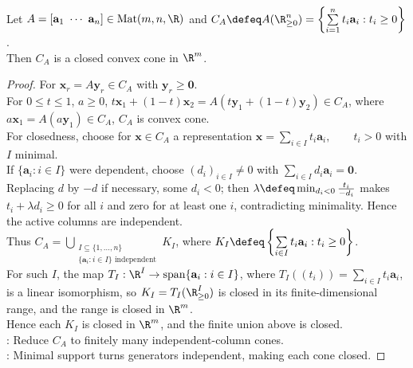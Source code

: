 \begin{lemma} \label{lem:finitely-generated-nonnegative-cone-closed-convex} \\
Let $A=[\mathbf{a}_1\ \cdots\ \mathbf{a}_n]\in\operatorname{Mat}(m,n,\R)$ and $C_A\defeq A(\R_{\geq0}^n)=\left\{\sum\limits_{i=1}^n t_i\mathbf{a}_i:t_i\geq0\right\}$.\\
Then $C_A$ is a closed convex cone in $\R^m$.
\begin{proof}
For $\mathbf{x}_r=A\mathbf{y}_r\in C_A$ with $\mathbf{y}_r\geq\mathbf{0}$.\\
For $0\leq t\leq1$, $a\geq0$, $t\mathbf{x}_1+(1-t)\mathbf{x}_2=A(t\mathbf{y}_1+(1-t)\mathbf{y}_2)\in C_A$, where $a\mathbf{x}_1=A(a\mathbf{y}_1)\in C_A$, $C_A$ is convex cone.\\
For closedness, choose for $\mathbf{x}\in C_A$ a representation $\mathbf{x}=\sum\limits_{i\in I}t_i\mathbf{a}_i,\qquad t_i>0$ with $I$ minimal.\\
If $\{\mathbf{a}_i:i\in I\}$ were dependent, choose $(d_i)_{i\in I}\neq0$ with $\sum\limits_{i\in I}d_i\mathbf{a}_i=\mathbf{0}$.\\
Replacing $d$ by $-d$ if necessary, some $d_i<0$; then $\lambda\defeq\min_{d_i<0}\frac{t_i}{-d_i}$ makes $t_i+\lambda d_i\geq0$ for all $i$ and zero for at least one $i$, contradicting minimality. Hence the active columns are independent.\\
Thus $C_A=\bigcup\limits_{\substack{I\subseteq\{1,\ldots,n\}\\ \{\mathbf{a}_i:i\in I\}\text{ independent}}} K_I$, where $K_I\defeq\left\{\sum\limits_{i\in I}t_i\mathbf{a}_i:t_i\geq0\right\}$.\\
For such $I$, the map $T_I:\R^I\to\operatorname{span}\{\mathbf{a}_i:i\in I\}$, where $T_I((t_i))=\sum\limits_{i\in I}t_i\mathbf{a}_i$, is a linear isomorphism, so $K_I=T_I(\R_{\geq0}^I)$ is closed in its finite-dimensional range, and the range is closed in $\R^m$.\\
Hence each $K_I$ is closed in $\R^m$, and the finite union above is closed.\\
: Reduce $C_A$ to finitely many independent-column cones.\\
: Minimal support turns generators independent, making each cone closed.
\end{proof}
\end{lemma}

